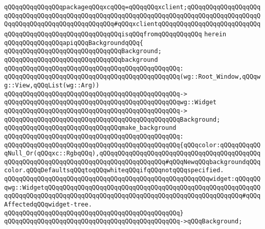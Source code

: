 \verb|qQQqqQQqqQQqqQQqpackageqQQqxcqQQq=qQQqqQQqxclient;qQQqqQQqqQQqqQQqqQQqqQQqqQQqqQQqqQQqqQQqqQQqqQQqqQQqqQQqqQQqqQQqqQQqqQQqqQQqqQQqqQQqqQQqqQQqqQQqqQQqqQQqqQQqqQQqqQQqqQQq#qQQqxclientqQQqqQQqqQQqqQQqqQQqqQQqqQQqqQQqqQQqqQQqqQQqqQQqqQQqqQQqqQQqisqQQqfromqQQqqQQqqQQq|\newline
\verb|herein|\newline
\newline
\verb|qQQqqQQqqQQqqQQqapiqQQqBackgroundqQQq{|\newline
\newline
\verb|qQQqqQQqqQQqqQQqqQQqqQQqqQQqqQQqBackground;|\newline
\newline
\verb|qQQqqQQqqQQqqQQqqQQqqQQqqQQqqQQqbackground|\newline
\verb|qQQqqQQqqQQqqQQqqQQqqQQqqQQqqQQqqQQqqQQqqQQqqQQq:|\newline
\verb|qQQqqQQqqQQqqQQqqQQqqQQqqQQqqQQqqQQqqQQqqQQqqQQq(wg::Root_Window,qQQqwg::View,qQQqList(wg::Arg))|\newline
\verb|qQQqqQQqqQQqqQQqqQQqqQQqqQQqqQQqqQQqqQQqqQQqqQQq->|\newline
\verb|qQQqqQQqqQQqqQQqqQQqqQQqqQQqqQQqqQQqqQQqqQQqqQQqwg::Widget|\newline
\verb|qQQqqQQqqQQqqQQqqQQqqQQqqQQqqQQqqQQqqQQqqQQqqQQq->|\newline
\verb|qQQqqQQqqQQqqQQqqQQqqQQqqQQqqQQqqQQqqQQqqQQqqQQqBackground;|\newline
\newline
\verb|qQQqqQQqqQQqqQQqqQQqqQQqqQQqqQQqmake_background|\newline
\verb|qQQqqQQqqQQqqQQqqQQqqQQqqQQqqQQqqQQqqQQqqQQqqQQq:|\newline
\verb|qQQqqQQqqQQqqQQqqQQqqQQqqQQqqQQqqQQqqQQqqQQqqQQq{qQQqcolor:qQQqqQQqqQQqNull_Or(qQQqxc::RgbqQQq),qQQqqQQqqQQqqQQqqQQqqQQqqQQqqQQqqQQqqQQqqQQqqQQqqQQqqQQqqQQqqQQqqQQqqQQqqQQqqQQqqQQqqQQq#qQQqNewqQQqbackgroundqQQqcolor.qQQqDefaultsqQQqtoqQQqwhiteqQQqifqQQqnotqQQqspecified.|\newline
\verb|qQQqqQQqqQQqqQQqqQQqqQQqqQQqqQQqqQQqqQQqqQQqqQQqqQQqqQQqwidget:qQQqqQQqwg::WidgetqQQqqQQqqQQqqQQqqQQqqQQqqQQqqQQqqQQqqQQqqQQqqQQqqQQqqQQqqQQqqQQqqQQqqQQqqQQqqQQqqQQqqQQqqQQqqQQqqQQqqQQqqQQqqQQqqQQqqQQqqQQq#qQQqAffectedqQQqwidget-tree.|\newline
\verb|qQQqqQQqqQQqqQQqqQQqqQQqqQQqqQQqqQQqqQQqqQQqqQQq}|\newline
\verb|qQQqqQQqqQQqqQQqqQQqqQQqqQQqqQQqqQQqqQQqqQQqqQQq->qQQqBackground;|\newline
